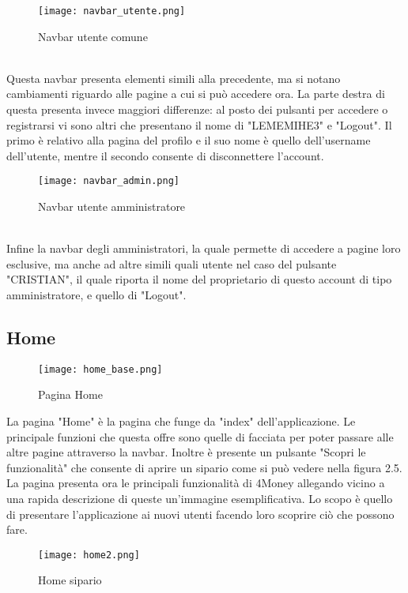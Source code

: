 \documentclass[binding=0.6cm, oneside, noexaminfo, italian]{sapthesis}
\begin{document}
\begin{figure}[h]
    \centering
    \texttt{[image: navbar\_utente.png]}
    \caption{Navbar utente comune}
    \label{fig:navbar_utente}
\end{figure} \\
Questa navbar presenta elementi simili alla precedente, ma si notano cambiamenti riguardo alle pagine a cui si può accedere ora. La parte destra di questa presenta invece maggiori differenze: al posto dei pulsanti per accedere o registrarsi vi sono altri che presentano il nome di "LEMEMIHE3" e "Logout". Il primo è relativo alla pagina del profilo e il suo nome è quello dell'username dell'utente, mentre il secondo consente di disconnettere l'account. \\
\begin{figure}[h]
    \centering
    \texttt{[image: navbar\_admin.png]}
    \caption{Navbar utente amministratore}
    \label{fig:navbar_admin}
\end{figure} \\
Infine la navbar degli amministratori, la quale permette di accedere a pagine loro esclusive, ma anche ad altre simili quali utente nel caso del pulsante "CRISTIAN", il quale riporta il nome del proprietario di questo account di tipo amministratore, e quello di "Logout".
\newpage
\subsection{Home}
\begin{figure}[h]
    \centering
    \texttt{[image: home\_base.png]}
    \caption{Pagina Home}
    \label{fig:home}
\end{figure}
La pagina "Home" è la pagina che funge da "index" dell'applicazione. Le principale funzioni che questa offre sono quelle di facciata per poter passare alle altre pagine attraverso la navbar. Inoltre è presente un pulsante "Scopri le funzionalità" che consente di aprire un sipario come si può vedere nella figura 2.5. La pagina presenta ora le principali funzionalità di 4Money allegando vicino a una rapida descrizione di queste un'immagine esemplificativa. Lo scopo è quello di presentare l'applicazione ai nuovi utenti facendo loro scoprire ciò che possono fare.
\begin{figure}[!ht]
    \centering
    \texttt{[image: home2.png]}
    \caption{Home sipario}
    \label{fig:home_sipario}
\end{figure}
\newpage
\end{document}
